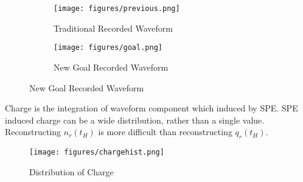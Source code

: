 \begin{figure}[H]
\begin{minipage}{.45\textwidth}
\begin{figure}[H]
    \centering
    \texttt{[image: figures/previous.png]}
    \caption{\label{fig:tradi} Traditional Recorded Waveform}
\end{figure}
\end{minipage}
\begin{minipage}{.45\textwidth}
\begin{figure}[H]
    \centering
    \texttt{[image: figures/goal.png]}
    \caption{\label{fig:new} New Goal Recorded Waveform}
\end{figure}
\end{minipage}
\end{figure}

Charge is the integration of waveform component which induced by SPE. SPE induced charge can be a wide distribution, rather than a single value. Reconstructing $n_{r}(t_{H})$ is more difficult than reconstructing $q_{r}(t_{H})$. 

\begin{figure}[H]
    \centering
    \texttt{[image: figures/chargehist.png]}
    \caption{\label{fig:charge} Distribution of Charge}
\end{figure}

